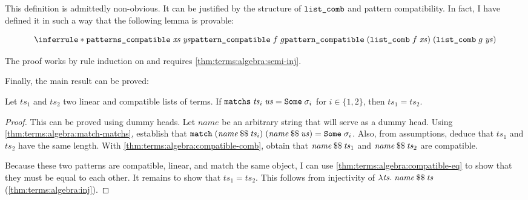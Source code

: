 \noindent
This definition is admittedly non-obvious.
It can be justified by the structure of $\texttt{\textup{list\_comb}}$ and pattern compatibility.
In fact, I have defined it in such a way that the following lemma is provable:
%
\begin{lemma}\label{thm:terms:algebra:compatible-comb}
  \[
    \inferrule*{
      \holconst{patterns\_compatible}\;\mathit{xs}\;\mathit{ys} \\
      \holconst{pattern\_compatible}\;f\;g
    }{
      \holconst{pattern\_compatible}\;(\holconst{list\_comb}\;f\;\mathit{xs})\;(\holconst{list\_comb}\;g\;\mathit{ys})
    }
  \]
\end{lemma}

\noindent
The proof works by rule induction on  and requires \cref{thm:terms:algebra:semi-inj}.

Finally, the main result can be proved:
%
\begin{corollary}\label{thm:terms:algebra:compatibles-eq}
  Let $\mathit{ts}_1$ and $\mathit{ts}_2$ two linear and compatible lists of terms.
  If $\texttt{\textup{matchs}}\;\mathit{ts}_i\;\mathit{us} = \texttt{\textup{Some}}\;\sigma_i$ for $i \in \{1,2\}$, then $\mathit{ts}_1 = \mathit{ts}_2$.
\end{corollary}
%
\begin{proof}
  This can be proved using dummy heads.
  Let $\mathit{name}$ be an arbitrary string that will serve as a dummy head.
  Using \cref{thm:terms:algebra:match-matchs}, establish that $\texttt{\textup{match}}\;(\mathit{name}\mathbin{\$\$}\mathit{ts}_i)\;(\mathit{name}\mathbin{\$\$}\mathit{us}) = \texttt{\textup{Some}}\;\sigma_i$.
  Also, from assumptions, deduce that $\mathit{ts}_1$ and $\mathit{ts}_2$ have the same length.
  With \cref{thm:terms:algebra:compatible-comb}, obtain that $\mathit{name}\mathbin{\$\$}\mathit{ts}_1$ and $\mathit{name}\mathbin{\$\$}\mathit{ts}_2$ are compatible.

  Because these two patterns are compatible, linear, and match the same object, I can use \cref{thm:terms:algebra:compatible-eq} to show that they must be equal to each other.
  It remains to show that $\mathit{ts}_1 = \mathit{ts}_2$.
  This follows from injectivity of $\lambda \mathit{ts}.\;\mathit{name}\mathbin{\$\$}\mathit{ts}$ (\cref{thm:terms:algebra:inj}).
\end{proof}
